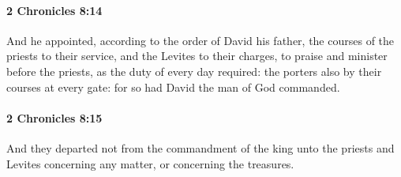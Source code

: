 		\paragraph{2 Chronicles 8:14} %
			\label{2CHRONICLES-8-14}

			And he appointed, according to the order of David his father, the courses of the priests to their service, and the Levites to their charges, to praise and minister before the priests, as the duty of every day required: the porters also by their courses at every gate: for so had David the man of God commanded.


		\paragraph{2 Chronicles 8:15} %
			\label{2CHRONICLES-8-15}

			And they departed not from the commandment of the king unto the priests and Levites concerning any matter, or concerning the treasures.

